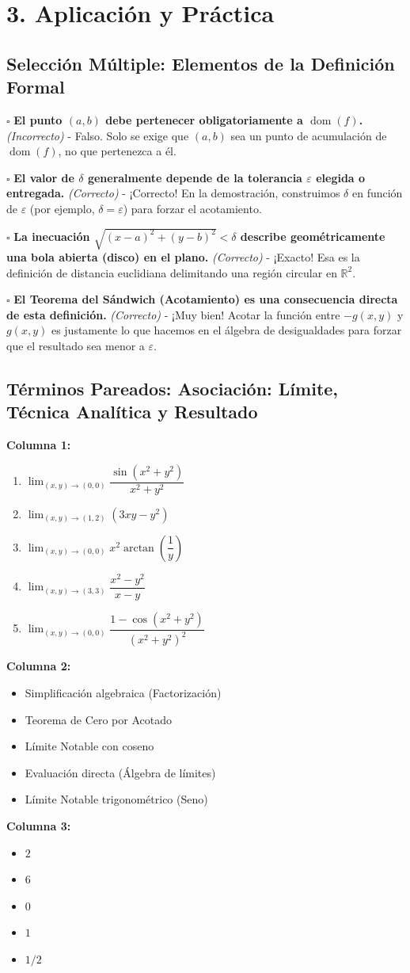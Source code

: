 \documentclass[11pt]{article}
\newenvironment{aplicacion}{%
  \section*{3. Aplicación y Práctica}%
}{}
\newenvironment{preguntacasillas}[1]{\subsection*{Selección Múltiple: #1}\par\vspace{0.1cm}}{\vspace{0.3cm}}
\newcommand{\casilla}[3]{\par\noindent $\square$ \textbf{#1} \textit{(#2)} - #3\par\vspace{0.15cm}}
\newenvironment{pareadostrescolumnas}[1]{\subsection*{Términos Pareados: #1}}{\vspace{0.3cm}}
\newcommand{\columnaI}[1]{\textbf{Columna 1:}\begin{enumerate}#1\end{enumerate}}
\newcommand{\columnaII}[1]{\textbf{Columna 2:}\begin{itemize}#1\end{itemize}}
\newcommand{\columnaIII}[1]{\textbf{Columna 3:}\begin{itemize}#1\end{itemize}}
\begin{document}
\begin{aplicacion}
\begin{preguntacasillas}{Elementos de la Definición Formal}
    \casilla{El punto $(a, b)$ debe pertenecer obligatoriamente a $\operatorname{dom}(f)$.}{Incorrecto}{Falso. Solo se exige que $(a,b)$ sea un punto de acumulación de $\operatorname{dom}(f)$, no que pertenezca a él.}
    \casilla{El valor de $\delta$ generalmente depende de la tolerancia $\varepsilon$ elegida o entregada.}{Correcto}{¡Correcto! En la demostración, construimos $\delta$ en función de $\varepsilon$ (por ejemplo, $\delta = \varepsilon$) para forzar el acotamiento.}
    \casilla{La inecuación $\sqrt{(x-a)^2 + (y-b)^2} < \delta$ describe geométricamente una bola abierta (disco) en el plano.}{Correcto}{¡Exacto! Esa es la definición de distancia euclidiana delimitando una región circular en $\mathbb{R}^2$.}
    \casilla{El Teorema del Sándwich (Acotamiento) es una consecuencia directa de esta definición.}{Correcto}{¡Muy bien! Acotar la función entre $-g(x,y)$ y $g(x,y)$ es justamente lo que hacemos en el álgebra de desigualdades para forzar que el resultado sea menor a $\varepsilon$.}
  \end{preguntacasillas}

  \begin{pareadostrescolumnas}{Asociación: Límite, Técnica Analítica y Resultado}
    
    \columnaI{
      \item $\displaystyle \lim_{(x,y)\to(0,0)} \dfrac{\sin(x^2+y^2)}{x^2+y^2}$
      \item $\displaystyle \lim_{(x,y)\to(1,2)} (3xy - y^2)$
      \item $\displaystyle \lim_{(x,y)\to(0,0)} x^2 \arctan\left(\dfrac{1}{y}\right)$
      \item $\displaystyle \lim_{(x,y)\to(3,3)} \dfrac{x^2-y^2}{x-y}$
      \item $\displaystyle \lim_{(x,y)\to(0,0)} \dfrac{1-\cos(x^2+y^2)}{(x^2+y^2)^2}$
    }
    
    \columnaII{
      \item Simplificación algebraica (Factorización)
      \item Teorema de Cero por Acotado
      \item Límite Notable con coseno
      \item Evaluación directa (Álgebra de límites)
      \item Límite Notable trigonométrico (Seno)
    }
    
    \columnaIII{
      \item $2$
      \item $6$
      \item $0$
      \item $1$
      \item $1/2$
    }


\end{pareadostrescolumnas}
\end{aplicacion}
\end{document}
